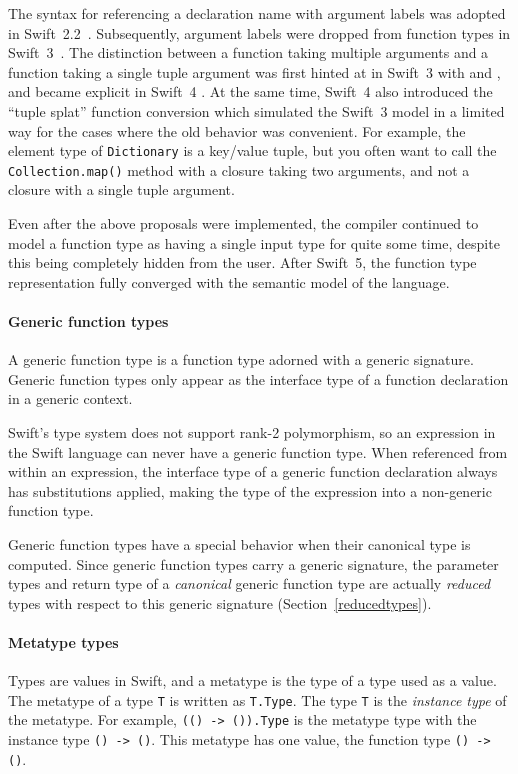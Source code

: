 \documentclass[a4paper,headsepline,bibliography=totoc,toc=flat,fleqn,twoside=semi]{scrbook}
\theoremstyle{definition}
\theoremstyle{definition}
\theoremstyle{definition}
\begin{document}
The syntax for referencing a declaration name with argument labels was adopted in Swift~2.2~\cite{se0021}. Subsequently, argument labels were dropped from function types in Swift~3~\cite{se0111}. The distinction between a function taking multiple arguments and a function taking a single tuple argument was first hinted at in Swift~3 with \cite{se0029} and \cite{se0066}, and became explicit in Swift~4 \cite{se0110}. At the same time, Swift~4 also introduced the ``tuple splat'' function conversion which simulated the Swift~3 model in a limited way for the cases where the old behavior was convenient. For example, the element type of \texttt{Dictionary} is a key/value tuple, but you often want to call the \texttt{Collection.map()} method with a closure taking two arguments, and not a closure with a single tuple argument.

Even after the above proposals were implemented, the compiler continued to model a function type as having a single input type for quite some time, despite this being completely hidden from the user. After Swift~5, the function type representation fully converged with the semantic model of the language.

\paragraph{Generic function types}
A generic function type is a function type adorned with a generic signature. Generic function types only appear as the interface type of a function declaration in a generic context. 

Swift's type system does not support rank-2 polymorphism, so an expression in the Swift language can never have a generic function type. When referenced from within an expression, the interface type of a generic function declaration always has substitutions applied, making the type of the expression into a non-generic function type.

Generic function types have a special behavior when their canonical type is computed. Since generic function types carry a generic signature, the parameter types and return type of a \emph{canonical} generic function type are actually \emph{reduced} types with respect to this generic signature (Section~\ref{reducedtypes}).

\paragraph{Metatype types}
Types are values in Swift, and a metatype is the type of a type used as a value. The metatype of a type \texttt{T} is written as \texttt{T.Type}. The type \texttt{T} is the \emph{instance type} of the metatype. For example, \texttt{(()~->~()).Type} is the metatype type with the instance type \verb|() -> ()|. This metatype has one value, the function type \verb|() -> ()|.
\end{document}
